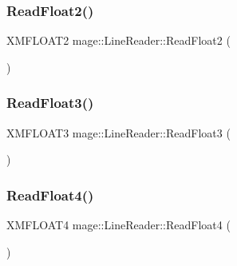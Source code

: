 \subsubsection{\texorpdfstring{Read\+Float2()}{ReadFloat2()}}
{\footnotesize\ttfamily X\+M\+F\+L\+O\+A\+T2 mage\+::\+Line\+Reader\+::\+Read\+Float2 (\begin{DoxyParamCaption}{ }\end{DoxyParamCaption})\hspace{0.3cm}{\ttfamily [protected]}}

\hypertarget{classmage_1_1_line_reader_a44ca5af0189b181a0a361039015be2a3}{}\label{classmage_1_1_line_reader_a44ca5af0189b181a0a361039015be2a3} 
\subsubsection{\texorpdfstring{Read\+Float3()}{ReadFloat3()}}
{\footnotesize\ttfamily X\+M\+F\+L\+O\+A\+T3 mage\+::\+Line\+Reader\+::\+Read\+Float3 (\begin{DoxyParamCaption}{ }\end{DoxyParamCaption})\hspace{0.3cm}{\ttfamily [protected]}}

\hypertarget{classmage_1_1_line_reader_abf882fa99812f0b6f4d0d4af5b18b3f5}{}\label{classmage_1_1_line_reader_abf882fa99812f0b6f4d0d4af5b18b3f5} 
\subsubsection{\texorpdfstring{Read\+Float4()}{ReadFloat4()}}
{\footnotesize\ttfamily X\+M\+F\+L\+O\+A\+T4 mage\+::\+Line\+Reader\+::\+Read\+Float4 (\begin{DoxyParamCaption}{ }\end{DoxyParamCaption})\hspace{0.3cm}{\ttfamily [protected]}}

\hypertarget{classmage_1_1_line_reader_a3b124e598e5b005476951b882dd85ea7}{}\label{classmage_1_1_line_reader_a3b124e598e5b005476951b882dd85ea7} 
